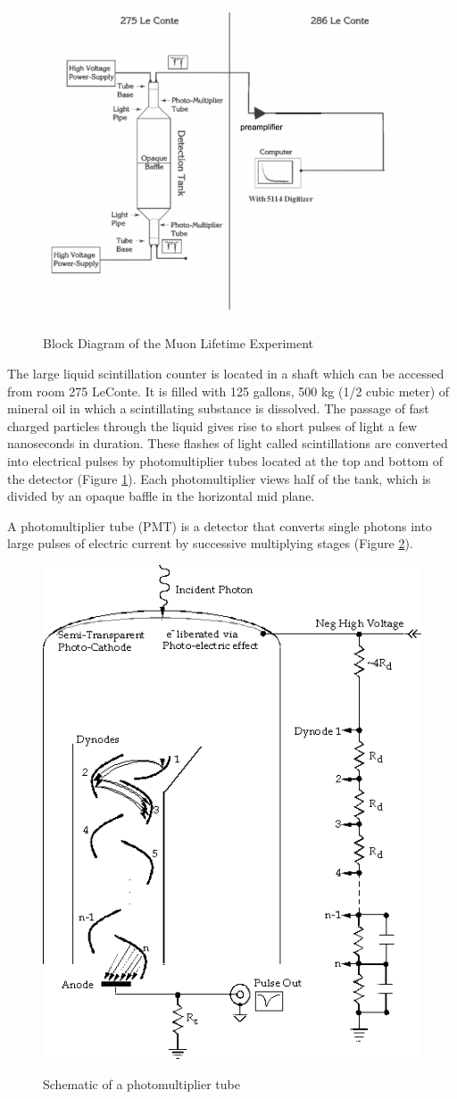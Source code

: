 \documentclass{../lab}
\begin{document}
\begin{figure}[h]
    \centering
    \href{http://experimentationlab.berkeley.edu/sites/default/files/images/750px-Muon_Equip_New_fig1.png}{\includegraphics[width=0.5\linewidth]{images/750px-Muon_Equip_New_fig1.png}}
    \caption{Block Diagram of the Muon Lifetime Experiment}
    \label{fig:BlockDiagram}
\end{figure}

The large liquid scintillation counter is located in a shaft which can be accessed from room 275 LeConte. It is filled with 125 gallons, 500 kg (1/2 cubic meter) of mineral oil in which a scintillating substance is dissolved. The passage of fast charged particles through the liquid gives rise to short pulses of light a few nanoseconds in duration. These flashes of light called scintillations are converted into electrical pulses by photomultiplier tubes located at the top and bottom of the detector (Figure \ref{fig:BlockDiagram}). Each photomultiplier views half of the tank, which is divided by an opaque baffle in the horizontal mid plane.

A photomultiplier tube (PMT) is a detector that converts single photons into large pulses of electric current by successive multiplying stages (Figure \ref{fig:PhotomultiplierTube}).

\begin{figure}[h]
    \centering
    \href{http://experimentationlab.berkeley.edu/sites/default/files/images/MUOimage056.gif}{\includegraphics[width=0.5\linewidth]{images/MUOimage056.png}}
    \caption{Schematic of a photomultiplier tube}
    \label{fig:PhotomultiplierTube}
\end{figure}
\end{document}
